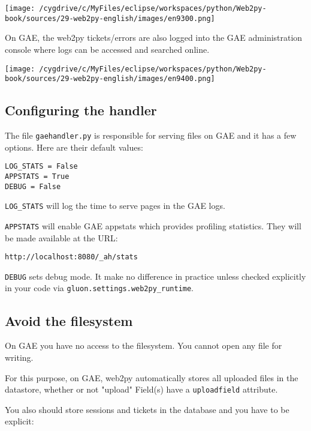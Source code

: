 \documentclass[justified,sixbynine,notoc]{tufte-book}
\def\ft{\small\tt}
\begin{document}
\begin{fullwidth}
\goodbreak\begin{center}\texttt{[image: /cygdrive/c/MyFiles/eclipse/workspaces/python/Web2py-book/sources/29-web2py-english/images/en9300.png]}\end{center}


On GAE, the web2py tickets/errors are also logged into the GAE administration console where logs can be accessed and searched online.


\goodbreak\begin{center}\texttt{[image: /cygdrive/c/MyFiles/eclipse/workspaces/python/Web2py-book/sources/29-web2py-english/images/en9400.png]}\end{center}


\goodbreak\subsection{Configuring the handler}

The file {\ft gaehandler.py} is responsible for serving files on GAE and it has a few options. Here are their default values:

\begin{lstlisting}
LOG_STATS = False
APPSTATS = True
DEBUG = False
\end{lstlisting}

{\ft LOG\_STATS} will log the time to serve pages in the GAE logs.

{\ft APPSTATS} will enable GAE appstats which provides profiling statistics. They will be made available at the URL:

\begin{lstlisting}[keywords={}]
http://localhost:8080/_ah/stats
\end{lstlisting}

{\ft DEBUG} sets debug mode. It make no difference in practice unless checked explicitly in your code via {\ft gluon.settings.web2py\_runtime}.

\goodbreak\subsection{Avoid the filesystem}

On GAE you have no access to the filesystem. You cannot open any file for writing.

For this purpose, on GAE, web2py automatically stores all uploaded files in the datastore, whether or not "upload" Field(s) have a {\ft uploadfield} attribute.

You also should store sessions and tickets in the database and you have to be explicit:


\end{fullwidth}
\end{document}
